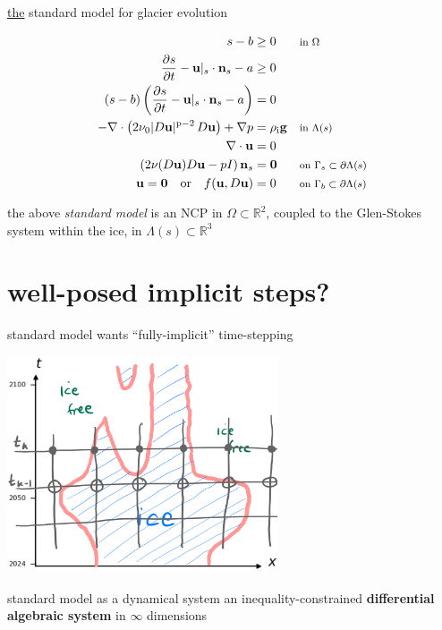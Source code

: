 \documentclass[10pt,dvipsnames]{beamer}
\newcommand{\bg}{\mathbf{g}}
\newcommand{\bn}{\mathbf{n}}
\newcommand{\bu}{\mathbf{u}}
\newcommand{\bzero}{\bm{0}}
\newcommand{\RR}{\mathbb{R}}
\newcommand{\pp}{\mathrm{p}}
\newcommand{\rhoi}{\rho_{\text{i}}}
\newcommand{\where}[1]{\text{\footnotesize #1}}
\begin{document}
\begin{frame}{\underline{the} standard model for glacier evolution}

\begin{align*}
s - b &\ge 0 & &\where{in $\Omega$} \\
\frac{\partial s}{\partial t} - \bu|_s \cdot \bn_s - a &\ge 0 \\
(s - b) \left(\frac{\partial s}{\partial t} - \bu|_s \cdot \bn_s - a\right) &= 0 \\
- \nabla \cdot \left(2 \nu_0 |D\bu|^{\pp-2}\, D\bu\right) + \nabla p &= \rhoi \bg && \where{in $\Lambda(s)$} \\
\nabla \cdot \bu &= 0 \\
\left(2 \nu(D\bu) D\bu - pI\right) \bn_s &= \bzero && \where{on $\Gamma_s \subset \partial\Lambda(s)$} \\
\bu  = \bzero \quad \text{or} \quad f(\bu,D\bu) &= 0 && \where{on $\Gamma_b \subset \partial\Lambda(s)$}
\end{align*}

\bigskip
\begin{definition}
the above \emph{standard model} is an NCP in $\Omega \subset \RR^2$, coupled to the Glen-Stokes system within the ice, in $\Lambda(s) \subset \RR^3$
\end{definition}
\end{frame}




\section{well-posed implicit steps?}

\begin{frame}{standard model wants ``fully-implicit'' time-stepping}

\begin{center}
\includegraphics[width=0.6\textwidth]{implicitstep}
\end{center}

\bigskip
\begin{block}{standard model as a dynamical system}
an inequality-constrained \textbf{differential algebraic system} in $\infty$ dimensions
\end{block}
\end{frame}
\end{document}
